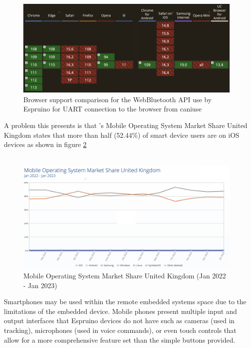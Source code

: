 \documentclass{l4proj}
\begin{document}
\begin{figure}[!ht]
    \centering
    \includegraphics[width=12cm]{dissertation/images/caniuse_webbluetooth.png}
    \caption{Browser support comparison for the WebBluetooth API use by Espruino for UART connection to the browser from caniuse}
    \label{fig:caniuse_webblue}
\end{figure}

A problem this presents is that \cite{mobile-os-market-share}'s Mobile Operating System Market Share United Kingdom states that more than half (52.44\%) of smart device users are on iOS devices as shown in figure \ref{fig:smartdeviceusage}\\\\

\begin{figure}[!ht]
    \centering
    \includegraphics[width=12cm]{dissertation/images/mobile-operating-system-usage.png}
    \caption{Mobile Operating System Market Share United Kingdom (Jan 2022 - Jan 2023)}
    \label{fig:smartdeviceusage}
\end{figure}

Smartphones may be used within the remote embedded systems space due to the limitations of the embedded device. Mobile phones present multiple input and output interfaces that Espruino devices do not have such as cameras (used in tracking), microphones (used in voice commands), or even touch controls that allow for a more comprehensive feature set than the simple buttons provided.
\\ 
\end{document}
